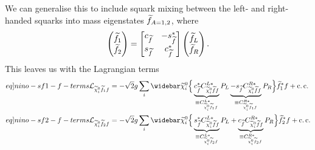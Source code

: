 \documentclass[english, notitlepage]{article}
\begin{document}
            We can generalise this to include squark mixing between the left- and right-handed squarks into mass eigenstates \(\widetilde{f}_{A=1,2}\), where
            \begin{align}
                \begin{pmatrix}
                    \widetilde{f}_1 \\
                    \widetilde{f}_2
                \end{pmatrix}
                =
                \begin{bmatrix}
                    c_{\widetilde{f}} & -s_{\widetilde{f}}^* \\
                    s_{\widetilde{f}} & c_{\widetilde{f}}^*
                \end{bmatrix} \begin{pmatrix}
                                  \widetilde{f}_L \\
                                  \widetilde{f}_R
                              \end{pmatrix}.
            \end{align}
            This leaves us with the Lagrangian terms
            \begin{subequations}
                \begin{align}
                    \label[eq]{nino-sf1-f-terms}
                    \L_{\nino[i] \wtilde{f}_1 f} = -\sqrt{2} g \sum_{i} \wbar{\wtilde{\chi}}^0_i & \Big\{ \underbrace{c_{\wtilde{f}}^* C_{\nino[i] \wtilde{f} f}^{L*}}_{\equiv C_{\nino[i] \wtilde{f}_1 f}^{L*}} P_L \underbrace{- s_{\wtilde{f}} C_{\nino[i] \wtilde{f} f}^{R*}}_{\equiv C_{\nino[i] \wtilde{f}_1 f}^{R*}} P_R \Big\} \wtilde{f}_1^* f + \cc \\
                    \label[eq]{nino-sf2-f-terms}
                    \L_{\nino[i] \wtilde{f}_2 f} = -\sqrt{2} g \sum_{i} \wbar{\wtilde{\chi}}^0_i & \Big\{ \underbrace{s_{\wtilde{f}}^* C_{\nino[i] \wtilde{f} f}^{L*}}_{\equiv C_{\nino[i] \wtilde{f}_2 f}^{L*}} P_L + \underbrace{c_{\wtilde{f}} C_{\nino[i] \wtilde{f} f}^{R*}}_{\equiv C_{\nino[i] \wtilde{f}_2 f}^{R*}} P_R \Big\} \wtilde{f}_2^* f + \cc
                \end{align}
            \end{subequations}
\end{document}
